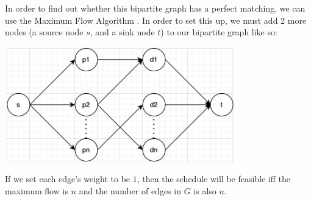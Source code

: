 \documentclass{article}
\begin{document}
In order to find out whether this bipartite graph has a perfect matching, we can use the Maximum Flow Algorithm \cite{website:2}. In order to set this up, we must add 2 more nodes (a source node $s$, and a sink node $t$) to our bipartite graph like so:

\begin{center}
    \includegraphics[width=10cm, height=5cm]{images/maximum-flow-graph.jpg}
\end{center}

If we set each edge's weight to be $1$, then the schedule will be feasible iff the maximum flow is $n$ and the number of edges in $G$ is also $n$.

\newpage
 

\end{document}
